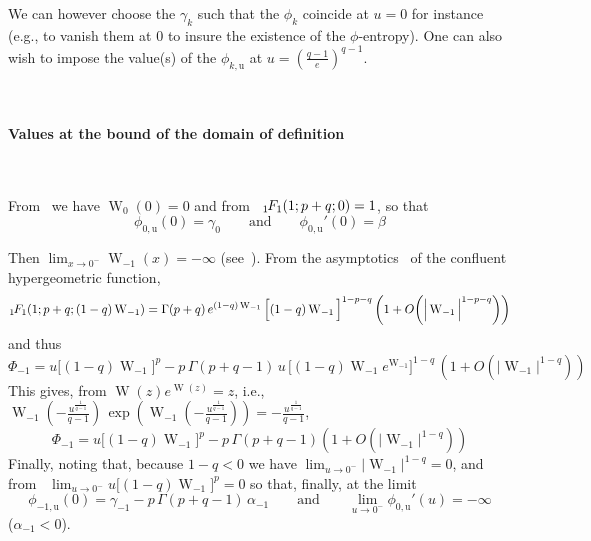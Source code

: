 \documentclass[entropy,article,submit,moreauthors,pdftex]{Definitions/mdpi}
\def\W{\operatorname{W}} %
\newcommand{\hypgeom}[2]{\mbox{}_{#1}\hspace{-1pt}F_{#2}}%
\def\u{\mathrm{u}}
\begin{document}
We can however choose the $\gamma_k$ such  that the $\phi_k$ coincide at $u = 0$
for  instance (e.g.,  to vanish  them  at $0$  to  insure the  existence of  the
$\phi$-entropy). One can  also wish to impose the value(s)  of the $\phi_{k,\u}$
at $u = \left( \frac{q-1}{e} \right)^{q-1}$.

\

\paragraph{\bf Values at the bound of the domain of definition}

\

From~\cite[Eq.~3.1]{CorGon96}     we     have      $\W_0(0)     =     0$     and
from~\cite[Eq.~13.1.2]{AbrSte70} $\hypgeom{1}{1}(1 ; p+q ; 0) = 1$, so that
%
\begin{equation}
\phi_{0,\u}(0) = \gamma_0 \qquad \mbox{and} \qquad \phi_{0,\u}'(0) = \beta
\end{equation}

Then $\displaystyle \lim_{x \to 0^-} \W_{-1}(x) = - \infty$ (see~\cite[Fig.~1 or
  Eq.~4.18]{CorGon96}). From the  asymptotics~\cite[Eq.~13.1.4]{AbrSte70} of the
confluent hypergeometric function,
%
\[
\hypgeom{1}{1}\left( 1 ; p+q ; (1-q) \W_{-1}
\right) = \Gamma(p+q) \, e^{(1-q) \W_{-1}} \, \Big[ (1-q) \W_{-1} \Big]^{1-p-q} \,
\left(1+  O\left(  \Big| \W_{-1}  \Big|^{1-p-q}  \right) \right)
\]
%
and  thus
%
\[
\Phi_{-1} = u \Big[ (1-q) \W_{-1} \Big]^p  - p \, \Gamma(p+q-1) \, u \, \Big[
  (1-q)  \W_{-1}  e^{\W_{-1}}  \Big]^{1-q}  \,   \left(1+  O\left(  \Big|  \W_{-1}
\Big|^{1-q} \right) \right)
\]
%
This   gives,   from   $\W(z)   e^{\W(z)}   =   z$,   i.e.,   $\W_{-1}\left(   -
\frac{u^{\frac{1}{q-1}}}{q-1}    \right)   \,    \exp\left(   \W_{-1}\left(    -
\frac{u^{\frac{1}{q-1}}}{q-1}         \right)         \right)        =         -
\frac{u^{\frac{1}{q-1}}}{q-1}$,
%
\[
\Phi_{-1} = u \Big[ (1-q) \W_{-1}  \Big]^p - p \, \Gamma(p+q-1) \left(1+ O\left(
\Big| \W_{-1} \Big|^{1-q} \right) \right)
\]
%
Finally, noting that, because $1-q <  0$ we have $\displaystyle \lim_{u \to 0^-}
\Big|  \W_{-1}   \Big|^{1-q}  =  0$,   and  from~\cite[Eq.~4.6  \&   lines  that
  follow]{CorGon96}  $\displaystyle  \lim_{u  \to  0^-} u  \Big[  (1-q)  \W_{-1}
  \Big]^p = 0$ so that, finally, at the limit
%
\begin{equation}
\phi_{-1,\u}(0)  =  \gamma_{-1}  -  p \,  \Gamma(p+q-1)  \,  \alpha_{-1}  \qquad
\mbox{and} \qquad \lim_{u \to 0^-} \phi_{0,\u}'(u) = -\infty
\end{equation}
%
($\alpha_{-1} < 0$).
\end{document}
